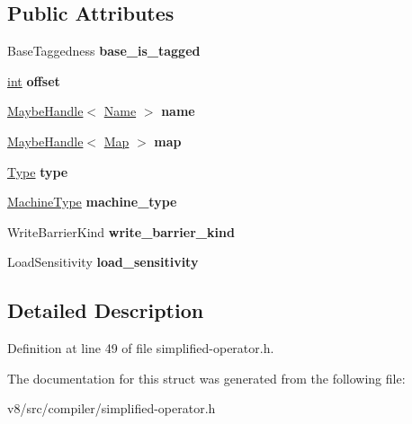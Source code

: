 \subsection*{Public Attributes}
\begin{DoxyCompactItemize}
\item 
\mbox{\label{structv8_1_1internal_1_1compiler_1_1FieldAccess_a80ad92a6cfa655dda1200a93561a1ec3}} 
Base\+Taggedness {\bfseries base\+\_\+is\+\_\+tagged}
\item 
\mbox{\label{structv8_1_1internal_1_1compiler_1_1FieldAccess_a5aaeb277363ca55ed97b67ff81355932}} 
\mbox{\hyperlink{classint}{int}} {\bfseries offset}
\item 
\mbox{\label{structv8_1_1internal_1_1compiler_1_1FieldAccess_af468636011578748fa656ff0814b1948}} 
\mbox{\hyperlink{classv8_1_1internal_1_1MaybeHandle}{Maybe\+Handle}}$<$ \mbox{\hyperlink{classv8_1_1internal_1_1Name}{Name}} $>$ {\bfseries name}
\item 
\mbox{\label{structv8_1_1internal_1_1compiler_1_1FieldAccess_a1fb989d61a7cc818e9f40b4b1f66cbd5}} 
\mbox{\hyperlink{classv8_1_1internal_1_1MaybeHandle}{Maybe\+Handle}}$<$ \mbox{\hyperlink{classv8_1_1internal_1_1Map}{Map}} $>$ {\bfseries map}
\item 
\mbox{\label{structv8_1_1internal_1_1compiler_1_1FieldAccess_ac73b0cc0b566c2d6fb56dac7e745d61b}} 
\mbox{\hyperlink{classv8_1_1internal_1_1compiler_1_1Type}{Type}} {\bfseries type}
\item 
\mbox{\label{structv8_1_1internal_1_1compiler_1_1FieldAccess_a720527577f74f00072701e8b997d014b}} 
\mbox{\hyperlink{classv8_1_1internal_1_1MachineType}{Machine\+Type}} {\bfseries machine\+\_\+type}
\item 
\mbox{\label{structv8_1_1internal_1_1compiler_1_1FieldAccess_ace3dcf509114b187c43c31b10f1eac7b}} 
Write\+Barrier\+Kind {\bfseries write\+\_\+barrier\+\_\+kind}
\item 
\mbox{\label{structv8_1_1internal_1_1compiler_1_1FieldAccess_af20d51180a3e5e7d85ffd2b031346522}} 
Load\+Sensitivity {\bfseries load\+\_\+sensitivity}
\end{DoxyCompactItemize}


\subsection{Detailed Description}


Definition at line 49 of file simplified-\/operator.\+h.



The documentation for this struct was generated from the following file\+:\begin{DoxyCompactItemize}
\item 
v8/src/compiler/simplified-\/operator.\+h\end{DoxyCompactItemize}

